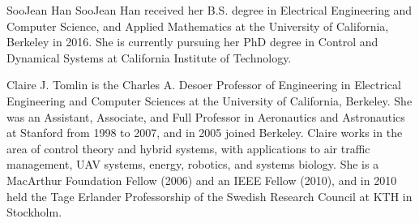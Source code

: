 \documentclass[journal]{IEEEtran}
\begin{document}
\begin{IEEEbiography}{SooJean Han}
	SooJean Han received her B.S. degree in Electrical Engineering and Computer Science, and Applied Mathematics at the University of California, Berkeley in 2016.  She is currently pursuing her PhD degree in Control and Dynamical Systems at California Institute of Technology.\vspace{-1cm}
\end{IEEEbiography}
\begin{IEEEbiography}{Claire J. Tomlin}
	is the Charles A. Desoer Professor of Engineering in Electrical Engineering and Computer Sciences at the University of California, Berkeley. She was an Assistant, Associate, and Full Professor in Aeronautics and Astronautics at Stanford from 1998 to 2007, and in 2005 joined Berkeley. Claire works in the area of control theory and hybrid systems, with applications to air traffic management, UAV systems, energy, robotics, and systems biology.  She is a MacArthur Foundation Fellow (2006) and an IEEE Fellow (2010), and in 2010 held the Tage Erlander Professorship of the Swedish Research Council at KTH in Stockholm.
\end{IEEEbiography}
\end{document}
